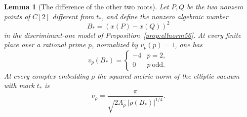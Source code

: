 \documentclass[a4paper,11pt]{article}
\newtheorem{lemma}[proposition]{Lemma}
\theoremstyle{definition}
\theoremstyle{remark}
\numberwithin{equation}{section}
\begin{document}
\begin{lemma}[The difference of the other two roots]\label{lem:weber58}
Let \(P,Q\) be the two nonzero points of \(C[2]\) different from
\(t_*\), and define the nonzero algebraic number
\[
                  B_*=(x(P)-x(Q))^2
\]
in the discriminant-one model of Proposition~\ref{prop:ellnorm56}.
At every finite place over a rational prime \(p\), normalized by
\(v_p(p)=1\), one has
\[
                      v_p(B_*)=
            \begin{cases}-4 & p=2,\\ 0 & p\ \text{odd}.\end{cases}
\]
At every complex embedding \(\rho\) the squared metric norm of the
elliptic vacuum with mark \(t_*\) is
\begin{equation}
            \nu_\rho=\frac{\pi}{\sqrt{2A_\rho}\,
                                               |\rho(B_*)|^{1/4}}.
                                                    \label{eq:weber58}
\end{equation}
\end{lemma}
\end{document}
